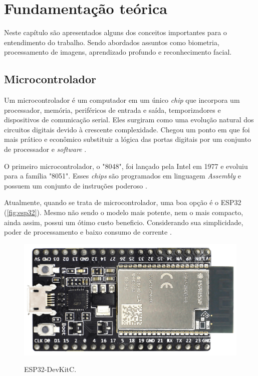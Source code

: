 \chapter{Fundamentação te\'orica}\label{cap:referencialTeorico}

Neste capítulo são apresentados alguns dos conceitos importantes para o entendimento
do trabalho. Sendo abordados assuntos como biometria, processamento de imagens, aprendizado 
profundo e reconhecimento facial.

\section{Microcontrolador}\label{sec:microcontrolador}

Um microcontrolador é um computador em um único \textit{chip} que incorpora um processador, 
memória, periféricos de entrada e saída, temporizadores e dispositivos de 
comunicação serial. Eles surgiram como uma evolução natural dos circuitos digitais 
devido à crescente complexidade. Chegou um ponto em que foi mais prático e 
econômico substituir a lógica das portas digitais por um conjunto de 
processador e \textit{software} \cite{penido2013}.

O primeiro microcontrolador, o "8048", foi lançado pela Intel em 1977 e evoluiu 
para a família "8051". Esses \textit{chips} são programados em linguagem \textit{Assembly} e 
possuem um conjunto de instruções poderoso \cite{penido2013}.

Atualmente, quando se trata de microcontrolador, uma boa opção é o ESP32 (\autoref{fig:esp32}). Mesmo não 
sendo o modelo mais potente, nem o mais compacto, ainda assim, possui um ótimo custo 
beneficio. Considerando sua simplicidade, poder de processamento e baixo consumo 
de corrente \cite{espressif2022c}.

\begin{figure}[h!]
    \centering
    \caption{ESP32-DevKitC.}
    \includegraphics[scale=0.13]{figuras/esp323.png} 
    \label{fig:esp32}
    \centering
\end{figure}

